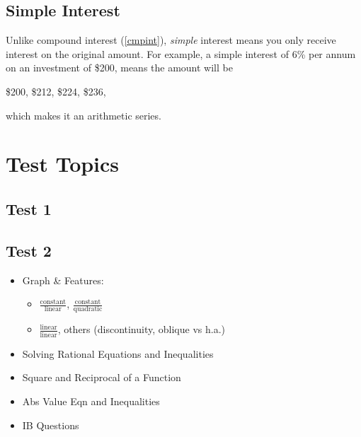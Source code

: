 \documentclass{article}
\numberwithin{equation}{section}
\begin{document}
\subsection{Simple Interest}
Unlike compound interest (\ref{cmpint}), \emph{simple} interest means you only receive interest on the original amount. For example, a simple interest of 6\% per annum on an investment of \$200, means the amount will be

\begin{center}
	\$200, \$212, \$224, \$236, \dotso
\end{center}
which makes it an arithmetic series.




\section{Test Topics}
\subsection{Test 1}
\subsection{Test 2}
\begin{itemize}
	\item Graph \& Features:
		\begin{itemize}
			\item $\displaystyle \frac{\mathrm{constant}}{\mathrm{linear}}$, $\displaystyle \frac{\mathrm{constant}}{\mathrm{quadratic}}$
			\item $\displaystyle \frac{\mathrm{linear}}{\mathrm{linear}}$, others (discontinuity, oblique vs h.a.)
		\end{itemize}
	\item Solving Rational Equations and Inequalities
	\item Square and Reciprocal of a Function
	\item Abs Value Eqn and Inequalities
	\item IB Questions
\end{itemize}
\end{document}
